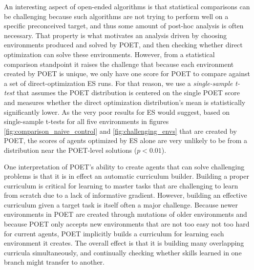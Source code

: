 \documentclass{article}
\newcommand{\todo}[1]{\comments{\textcolor{red}{[TODO: #1]}}}
\newcommand{\ks}[1]{\comments{\textcolor{purple}{[Ken: #1]}}}
\newcommand{\comments}[1]{#1}
\begin{document}
An interesting aspect of open-ended algorithms is that
statistical comparisons can be challenging 
because such algorithms are not trying to perform well on a specific preconceived target, and thus some amount of post-hoc analysis is often necessary.  That property is what
motivates an analysis driven by choosing environments produced and solved by POET, and then checking whether direct optimization can solve these environments.
However, from a statistical comparison standpoint it raises the challenge that because each environment created by POET is unique, we only have one score for POET to compare against a set of direct-optimization ES runs. For that reason, we use a \emph{single-sample t-test} that assumes the POET distribution is centered on the single POET score and measures whether the direct optimization distribution’s mean is statistically significantly lower. 
As the very poor results for ES would suggest, based on single-sample t-tests for all five environments in figures \ref{fig:comparison_naive_control} and \ref{fig:challenging_envs} that are created by POET, the scores of agents optimized by ES alone are very unlikely to be from a distribution near the POET-level solutions
($p < 0.01$). 

One interpretation of POET's ability to create agents that can solve challenging problems is that it is in effect an automatic curriculum builder. Building a proper curriculum is critical for learning to master tasks that are challenging to learn from scratch due to a lack of informative gradient. However, building an effective curriculum given a target task is itself often a major challenge. Because newer environments in POET are created through mutations of older environments and because POET only accepts new environments that are not too easy not too hard for current agents, POET implicitly builds a curriculum for learning each environment it creates.  The overall effect is that it is building many overlapping curricula simultaneously, and continually checking whether skills learned in one branch might transfer to another.
\end{document}
